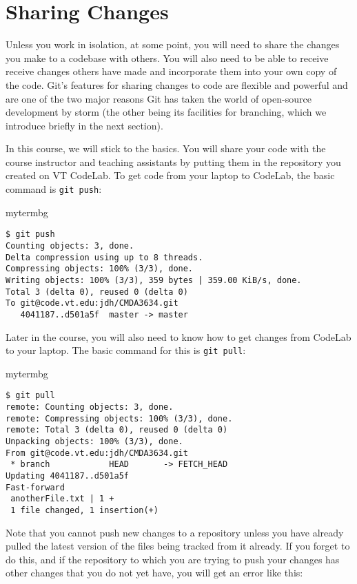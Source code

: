 \section{Sharing Changes}

Unless you work in isolation, at some point, you will need to share the changes
you make to a codebase with others.  You will also need to be able to receive
receive changes others have made and incorporate them into your own copy of the
code.  Git's features for sharing changes to code are flexible and powerful and
are one of the two major reasons Git has taken the world of open-source
development by storm (the other being its facilities for branching, which we
introduce briefly in the next section).

In this course, we will stick to the basics.  You will share your code with the
course instructor and teaching assistants by putting them in the repository you
created on VT CodeLab.  To get code from your laptop to CodeLab, the basic
command is \texttt{git push}:

\begin{tsession}{mytermbg}
\begin{verbatim}
$ git push
Counting objects: 3, done.
Delta compression using up to 8 threads.
Compressing objects: 100% (3/3), done.
Writing objects: 100% (3/3), 359 bytes | 359.00 KiB/s, done.
Total 3 (delta 0), reused 0 (delta 0)
To git@code.vt.edu:jdh/CMDA3634.git
   4041187..d501a5f  master -> master
\end{verbatim}
\end{tsession}

Later in the course, you will also need to know how to get changes from CodeLab
to your laptop.  The basic command for this is \texttt{git pull}:

\begin{tsession}{mytermbg}
\begin{verbatim}
$ git pull
remote: Counting objects: 3, done.
remote: Compressing objects: 100% (3/3), done.
remote: Total 3 (delta 0), reused 0 (delta 0)
Unpacking objects: 100% (3/3), done.
From git@code.vt.edu:jdh/CMDA3634.git
 * branch            HEAD       -> FETCH_HEAD
Updating 4041187..d501a5f
Fast-forward
 anotherFile.txt | 1 +
 1 file changed, 1 insertion(+)
\end{verbatim}
\end{tsession}

Note that you cannot push new changes to a repository unless you have already
pulled the latest version of the files being tracked from it already.  If you
forget to do this, and if the repository to which you are trying to push your
changes has other changes that you do not yet have, you will get an error like
this:

